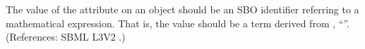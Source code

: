 The value of the attribute  on an \Event object should be
an SBO identifier referring to a mathematical expression.  That is, the
value should be a term derived from \sbointeractionID,
``''.  (References: SBML L3V2 .)
